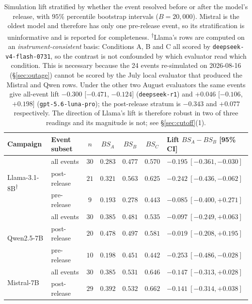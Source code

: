 \documentclass[11pt,journal,onecolumn]{IEEEtran}
\begin{document}
\begin{table}[!htbp]
\centering
\caption{Simulation lift stratified by whether the event resolved before or after the model's release, with $95\%$ percentile bootstrap intervals ($B = 20{,}000$). Mistral is the oldest model and therefore has only one pre-release event, so its stratification is uninformative and is reported for completeness. \textsuperscript{$\dagger$}Llama's rows are computed on an \emph{instrument-consistent} basis: Conditions A, B and C all scored by \texttt{deepseek-v4-flash-0731}, so the contrast is not confounded by which evaluator read which condition. This is necessary because the 24 events re-simulated on 2026-08-16 (\S\ref{sec:outage}) cannot be scored by the July local evaluator that produced the Mistral and Qwen rows. Under the other two August evaluators the same events give all-event lift $-0.300$ [$-0.471$, $-0.124$] (\texttt{deepseek-r1}) and $+0.046$ [$-0.106$, $+0.198$] (\texttt{gpt-5.6-luna-pro}); the post-release stratum is $-0.343$ and $+0.077$ respectively. The direction of Llama's lift is therefore robust in two of three readings and its magnitude is not; see \S\ref{sec:cutoff}(1).}
\label{tab:cutoff_lift}
\small
\begin{tabular}{llccccl}
\toprule
\textbf{Campaign} & \textbf{Event subset} & $n$ & $BS_A$ & $BS_B$ & $BS_C$ & \textbf{Lift $BS_A - BS_B$ [95\% CI]} \\
\midrule
\multirow{3}{*}{Llama-3.1-8B\textsuperscript{$\dagger$}}
 & all events    & $30$ & $0.283$ & $0.477$ & $0.570$ & $\mathbf{-0.195\ [-0.361, -0.030]}$ \\
 & post-release  & $21$ & $0.321$ & $0.563$ & $0.625$ & $\mathbf{-0.242\ [-0.436, -0.062]}$ \\
 & pre-release   & $9$  & $0.193$ & $0.278$ & $0.443$ & $-0.085\ [-0.400, +0.271]$ \\
\midrule
\multirow{3}{*}{Qwen2.5-7B}
 & all events    & $30$ & $0.385$ & $0.481$ & $0.535$ & $-0.097\ [-0.249, +0.063]$ \\
 & post-release  & $20$ & $0.478$ & $0.497$ & $0.581$ & $-0.019\ [-0.208, +0.195]$ \\
 & pre-release   & $10$ & $0.198$ & $0.451$ & $0.442$ & $\mathbf{-0.253\ [-0.486, -0.028]}$ \\
\midrule
\multirow{2}{*}{Mistral-7B}
 & all events    & $30$ & $0.385$ & $0.531$ & $0.646$ & $-0.147\ [-0.313, +0.028]$ \\
 & post-release  & $29$ & $0.392$ & $0.532$ & $0.662$ & $-0.141\ [-0.314, +0.038]$ \\
\bottomrule
\end{tabular}
\setlength{\tabcolsep}{6pt}
\end{table}
\end{document}
